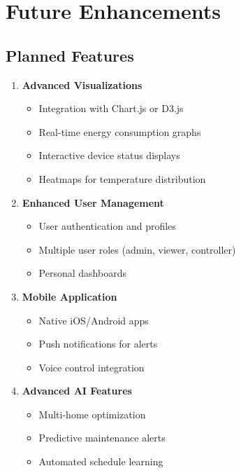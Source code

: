 \documentclass[12pt,a4paper]{article}
\begin{document}
\section{Future Enhancements}

\subsection{Planned Features}

\begin{enumerate}[leftmargin=*]
    \item \textbf{Advanced Visualizations}
    \begin{itemize}
        \item Integration with Chart.js or D3.js
        \item Real-time energy consumption graphs
        \item Interactive device status displays
        \item Heatmaps for temperature distribution
    \end{itemize}
    
    \item \textbf{Enhanced User Management}
    \begin{itemize}
        \item User authentication and profiles
        \item Multiple user roles (admin, viewer, controller)
        \item Personal dashboards
    \end{itemize}
    
    \item \textbf{Mobile Application}
    \begin{itemize}
        \item Native iOS/Android apps
        \item Push notifications for alerts
        \item Voice control integration
    \end{itemize}
    
    \item \textbf{Advanced AI Features}
    \begin{itemize}
        \item Multi-home optimization
        \item Predictive maintenance alerts
        \item Automated schedule learning
    \end{itemize}
\end{enumerate}
\end{document}
